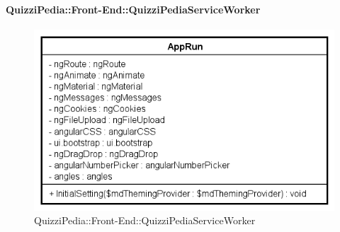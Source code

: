 	\paragraph{QuizziPedia::Front-End::QuizziPediaServiceWorker}
		
		\label{QuizziPedia::Front-End::QuizziPediaServiceWorker}
		
		\begin{figure}[ht]
			\centering
			\includegraphics[scale=0.45,keepaspectratio]{UML/Classi/Front-End/QuizziPedia_Front-end_QuizziPediaServiceWorker.png}
			\caption{QuizziPedia::Front-End::QuizziPediaServiceWorker}
		\end{figure} \FloatBarrier
		
